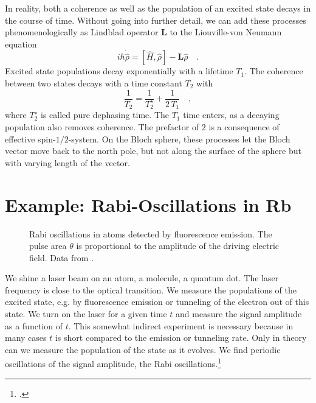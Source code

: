 In reality, both a coherence as well as the population of an excited state decays in the course of time. Without going into further detail, we can add these processes phenomenologically as Lindblad operator $\boldsymbol{L}$ to the Liouville-von Neumann equation
\begin{equation}
    i\hbar \dot{\hat{\rho}} =
    [\hat{H},\hat{\rho}] - \boldsymbol{L}  \hat{\rho} \quad .
\end{equation}
Excited state populations decay exponentially with a lifetime $T_1$. The coherence between two states decays with a time constant $T_2$ with
\begin{equation}
    \frac{1}{T_2} = \frac{1}{T_2^\star} + \frac{1}{2 \, T_1} \quad ,
\end{equation}
where $T_2^\star$ is called pure dephasing time. The $T_1$ time enters, as a decaying population also removes coherence. The prefactor of $2$ is a consequence of effective spin-$1/2$-system. On the Bloch sphere, these processes let the Bloch vector move back to the north pole, but not along the surface of the sphere but with varying length of the vector.





\section{Example: Rabi-Oscillations in Rb}

\begin{figure}[h!]
  \caption{Rabi oscillations in  atoms detected by fluorescence emission. The pulse area $\theta$ is proportional to the amplitude of the driving electric field. Data from \cite{Gibbs1973}.}
\end{figure}


We shine a laser beam on an atom, a molecule, a quantum dot. The laser frequency is close to the optical transition. We measure the populations of the excited state, e.g. by fluorescence emission or tunneling of the electron out of this state. We turn on the laser for a given time $t$ and measure the signal amplitude as a function of $t$. This somewhat indirect experiment is necessary because in many cases $t$ is short compared to the emission or tunneling rate. Only in theory can we measure the population of the state as it evolves. We find periodic oscillations of the signal amplitude, the Rabi oscillations.\footcite{Rabi1939}


\printbibliography[segment=\therefsegment,heading=subbibliography]
